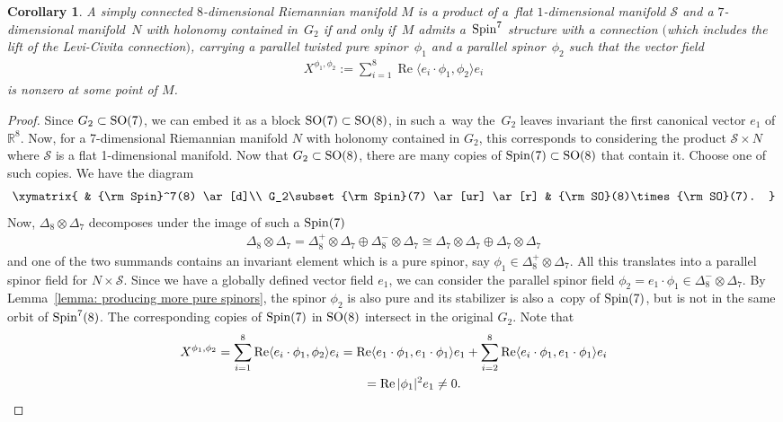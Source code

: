 \documentclass[10pt,a4paper]{amsart}
\numberwithin{equation}{section}
\newtheorem{Corollary}[Theorem]{Corollary}
\begin{document}
\begin{Corollary} A simply connected $8$-dimensional Riemannian manifold $M$ is a product of a~flat $1$-dimensional manifold $\mathcal{S}$ and a $7$-dimensional manifold~$N$ with holonomy contained in~$G_2$ if and only if~$M$ admits a~${\rm Spin}^7$ structure with a connection $($which includes the lift of the Levi-Civita connection$)$, carrying a parallel twisted pure spinor~$\phi_1$ and a parallel spinor~$\phi_2$ such that the vector field
\begin{gather*}X^{\phi_1,\phi_2}:=\sum_{i=1}^8 \operatorname{Re}\langle e_i\cdot \phi_1,\phi_2\rangle e_i\end{gather*}
is nonzero at some point of $M$.
\end{Corollary}
\begin{proof} Since $G_2\subset {\rm SO}(7)$, we can embed it as a block ${\rm SO}(7)\subset {\rm SO}(8)$, in such a~way the~$G_2$ leaves invariant the first canonical vector $e_1$ of $\mathbb{R}^8$. Now, for a 7-dimensional Riemannian manifold $N$ with holonomy contained in $G_2$, this corresponds to considering the product $\mathcal{S}\times N $ where $\mathcal{S}$ is a flat 1-dimensional manifold. Now that $G_2\subset {\rm SO}(8)$, there are many copies of ${\rm Spin}(7)\subset {\rm SO}(8)$ that contain it. Choose one of such copies. We have the diagram
\begin{gather*}
\xymatrix{
 & {\rm Spin}^7(8) \ar[d]\\
G_2\subset {\rm Spin}(7) \ar[ur] \ar[r] & {\rm SO}(8)\times {\rm SO}(7).
}
\end{gather*}
Now, $\Delta_8\otimes\Delta_7$ decomposes under the image of such a ${\rm Spin}(7)$
\begin{gather*}
\Delta_8\otimes\Delta_7 =\Delta_8^+\otimes\Delta_7\oplus\Delta_8^-\otimes\Delta_7\cong\Delta_7\otimes\Delta_7\oplus\Delta_7\otimes\Delta_7
\end{gather*}
and one of the two summands contains an invariant element which is a pure spinor, say $\phi_1\in\Delta_8^+\otimes\Delta_7$. All this translates into a parallel spinor field for $N\times\mathcal{S}$. Since we have a globally defined vector field $e_1$, we can consider the parallel spinor field $\phi_2=e_1\cdot \phi_1\in\Delta_8^-\otimes \Delta_7$. By Lemma~\ref{lemma: producing more pure spinors}, the spinor $\phi_2$ is also pure and its stabilizer is also a~copy of ${\rm Spin}(7)$, but is not in the same orbit of ${\rm Spin}^7(8)$. The corresponding copies of ${\rm Spin}(7)$ in ${\rm SO}(8)$ intersect in the original $G_2$. Note that
\begin{gather*}
X^{\phi_1,\phi_2} =\sum_{i=1}^8 \operatorname{Re}\langle e_i\cdot \phi_1,\phi_2\rangle e_i
= \operatorname{Re}\langle e_1\cdot \phi_1,e_1\cdot\phi_1\rangle e_1 + \sum_{i=2}^8 \operatorname{Re}\langle e_i\cdot \phi_1,e_1\cdot\phi_1\rangle e_i\\
\hphantom{X^{\phi_1,\phi_2}}{} = \operatorname{Re} |\phi_1|^2e_1\not = 0.
\end{gather*}


\end{proof}
\end{document}
